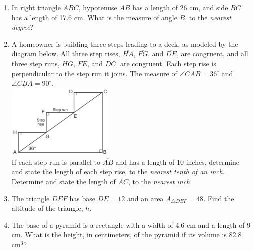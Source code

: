 \documentclass[12pt, twoside]{article}
\begin{document}
\begin{enumerate}
  \item In right triangle $ABC$, hypotenuse $\overline{AB}$ has a length of 26 cm, and side $\overline{BC}$ has a length of 17.6 cm. What is the measure of angle $B$, to the \emph{nearest degree}?

\newpage
    \item A homeowner is building three steps leading to a deck, as modeled by the diagram below. All three step rises, $\overline{HA}$,  $\overline{FG}$, and  $\overline{DE}$, are congruent, and all three step runs, $\overline{HG}$,  $\overline{FE}$, and  $\overline{DC}$, are congruent. Each step rise is perpendicular to the step run it joins. The measure of $\angle CAB = 36^\circ$ and $\angle CBA = 90^\circ$.\\[0.5cm]
      \includegraphics[width=0.4\textwidth]{steps_Aug2018-33.png}\\
    If each step run is parallel to $\overline{AB}$ and has a length of 10 inches, determine and state the length of each step rise, to the \emph{nearest tenth of an inch}.\\[3cm]
    Determine and state the length of $\overline{AC}$, to the \emph{nearest inch}.

\newpage

   \item The triangle $DEF$ has base $DE=12$ and an area $A_{\triangle DEF}= 48$. Find the altitude of the triangle, $h$.\\[0.5cm]
    \vspace{3.0cm}

  \item The base of a pyramid is a rectangle with a width of 4.6 cm and a length of 9 cm. What is the height, in centimeters, of the pyramid if its volume is 82.8 $\mathrm{cm}^3$? \vspace{3.0cm}

  \end{enumerate}
  \newpage
  \setcounter{page}{1}
\end{document}
